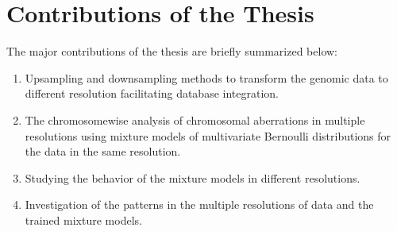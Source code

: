 \section{Contributions of the Thesis}
\label{s:contributions}
The major contributions of the thesis are briefly summarized below:

\begin{enumerate}
 \item Upsampling and downsampling methods to transform the genomic data to different resolution facilitating database integration.
 \item The chromosomewise analysis of chromosomal aberrations in multiple resolutions using mixture models of multivariate Bernoulli distributions for the data in the same resolution. 
 \item Studying the behavior of the mixture models in different resolutions.
 \item Investigation of the patterns in the multiple resolutions of data and the trained mixture models.
\end{enumerate}
